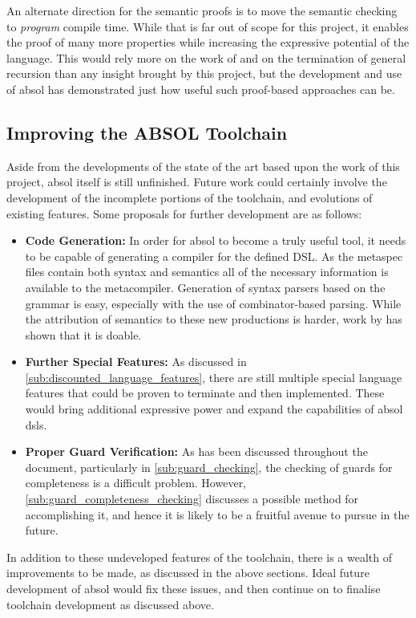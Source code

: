 An alternate direction for the semantic proofs is to move the semantic checking to \textit{program} compile time.
While that is far out of scope for this project, it enables the proof of many more properties while increasing the expressive potential of the language.
This would rely more on the work of \citet{hinze2010reasoning} and \citet{nordstrom1988terminating} on the termination of general recursion than any insight brought by this project, but the development and use of \gls{absol} has demonstrated just how useful such proof-based approaches can be.



\subsection{Improving the ABSOL Toolchain} %
\label{sub:improving_the_absol_toolchain}
Aside from the developments of the state of the art based upon the work of this project, \gls{absol} itself is still unfinished.
Future work could certainly involve the development of the incomplete portions of the toolchain, and evolutions of existing features.
Some proposals for further development are as follows:
\begin{itemize}
    \item \textbf{Code Generation:} In order for \gls{absol} to become a truly useful tool, it needs to be capable of generating a compiler for the defined DSL.
    As the \gls{metaspec} files contain both syntax and semantics all of the necessary information is available to the metacompiler.
    Generation of syntax parsers based on the grammar is easy, especially with the use of combinator-based parsing.
    While the attribution of semantics to these new productions is harder, work by \citet{diehl1996semantics} has shown that it is doable.
    \item \textbf{Further Special Features:} As discussed in \autoref{sub:discounted_language_features}, there are still multiple special language features that could be proven to terminate and then implemented.
    These would bring additional expressive power and expand the capabilities of \gls{absol} \glspl{dsl}.
    \item \textbf{Proper Guard Verification:} As has been discussed throughout the document, particularly in \autoref{sub:guard_checking}, the checking of guards for completeness is a difficult problem.
    However, \autoref{sub:guard_completeness_checking} discusses a possible method for accomplishing it, and hence it is likely to be a fruitful avenue to pursue in the future. 
\end{itemize}

In addition to these undeveloped features of the toolchain, there is a wealth of improvements to be made, as discussed in the above sections.
Ideal future development of \gls{absol} would fix these issues, and then continue on to finalise toolchain development as discussed above.



